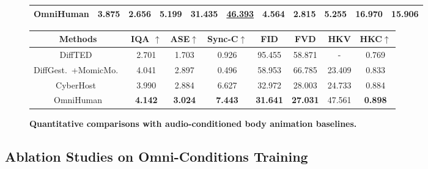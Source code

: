 \begin{figure}
{\begin{tabular}{ccccccccccc}
     OmniHuman & \textbf{3.875} & \textbf{2.656} & \textbf{5.199} & \textbf{31.435} & \underline{46.393} & \textbf{4.564} & \textbf{2.815} & \textbf{5.255} & \textbf{16.970} & \textbf{15.906} \\ %
  \bottomrule
  \end{tabular}
        }
        {
            \caption{\textbf{Quantitative comparisons with audio-conditioned body animation baselines.}}
  \label{Tab2}
  \centering
  \begin{tabular}{cccccccc}
    \toprule
          Methods &IQA $\uparrow$ & ASE$\uparrow$ & Sync-C$\uparrow$ & FID & FVD &HKV& HKC$\uparrow$  \\
    \midrule
    DiffTED~\cite{diffted} & 2.701 & 1.703 & 0.926 & 95.455 & 58.871 & - & 0.769 \\
    DiffGest.~\cite{zhu2023taming}+MomicMo.~\cite{zhang2024mimicmotion} & 4.041 & 2.897 & 0.496 & 58.953 & 66.785  & 23.409  & 0.833  \\
    CyberHost~\cite{lin2025cyberhost} & 3.990 & 2.884 & 6.627  &  32.972 & 28.003 & 24.733 & 0.884 \\
    OmniHuman & \textbf{4.142} & \textbf{3.024} & \textbf{7.443} & \textbf{31.641} & \textbf{27.031} & 47.561 & \textbf{0.898} \\
  \bottomrule
  \end{tabular}
        }
     
\end{figure}




\subsection{Ablation Studies on Omni-Conditions Training}


